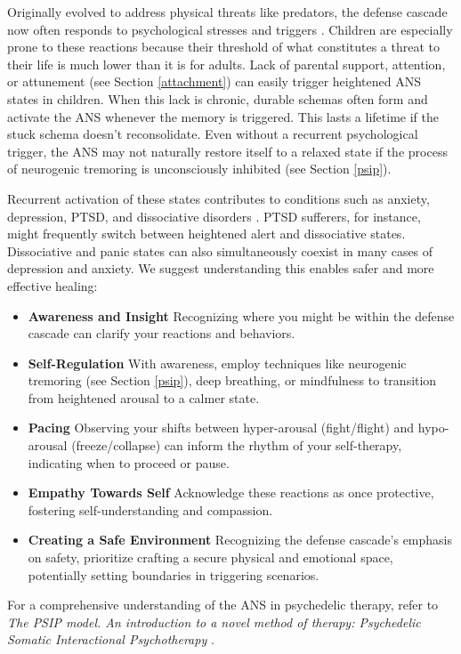 \documentclass[12pt,letterpaper]{article}
\begin{document}
Originally evolved to address physical threats like predators, the defense cascade now often responds to psychological stresses and triggers \cite{razviPSIP}. Children are especially prone to these reactions because their threshold of what constitutes a threat to their life is much lower than it is for adults. Lack of parental support, attention, or attunement (see Section \ref{attachment}) can easily trigger heightened ANS states in children. When this lack is chronic, durable schemas often form and activate the ANS whenever the memory is triggered. This lasts a lifetime if the stuck schema doesn't reconsolidate. Even without a recurrent psychological trigger, the ANS may not naturally restore itself to a relaxed state if the process of neurogenic tremoring is unconsciously inhibited (see Section \ref{psip}). 

Recurrent activation of these states contributes to conditions such as anxiety, depression, PTSD, and dissociative disorders \cite{razviPSIP}. PTSD sufferers, for instance, might frequently switch between heightened alert and dissociative states. Dissociative and panic states can also simultaneously coexist in many cases of depression and anxiety. We suggest understanding this enables safer and more effective healing: 
\begin{itemize}
    \item \textbf{Awareness and Insight} Recognizing where you might be within the defense cascade can clarify your reactions and behaviors.
    \item \textbf{Self-Regulation} With awareness, employ techniques like neurogenic tremoring (see Section \ref{psip}), deep breathing, or mindfulness to transition from heightened arousal to a calmer state.
    \item \textbf{Pacing} Observing your shifts between hyper-arousal (fight/flight) and hypo-arousal (freeze/collapse) can inform the rhythm of your self-therapy, indicating when to proceed or pause.
    \item \textbf{Empathy Towards Self} Acknowledge these reactions as once protective, fostering self-understanding and compassion.
    \item \textbf{Creating a Safe Environment} Recognizing the defense cascade's emphasis on safety, prioritize crafting a secure physical and emotional space, potentially setting boundaries in triggering scenarios.
\end{itemize}

For a comprehensive understanding of the ANS in psychedelic therapy, refer to \textit{The PSIP model. An introduction to a novel method of therapy: Psychedelic Somatic Interactional Psychotherapy} \cite{razviPSIP}.
\end{document}
